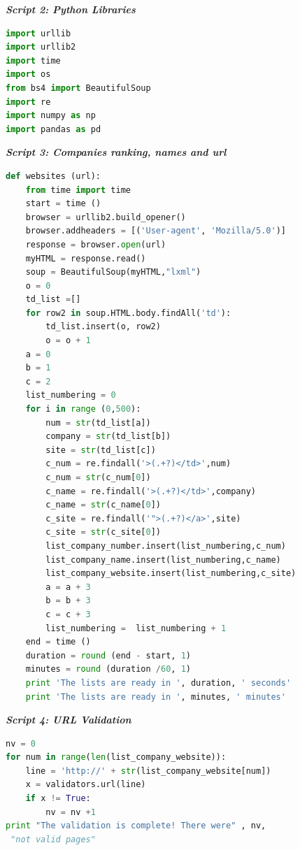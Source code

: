 \documentclass{book}
\begin{document}
\begin{center}
\textit{\textbf{Script 2: Python Libraries}}\label{p2}
\end{center}
\begin{lstlisting}[language=Python]
import urllib
import urllib2
import time
import os
from bs4 import BeautifulSoup
import re
import numpy as np
import pandas as pd\end{lstlisting}

\begin{center}
\textit{\textbf{Script 3: Companies ranking, names and url}}\label{p3}
\end{center}
\begin{lstlisting}[language=Python]
def websites (url): 
    from time import time
    start = time ()
    browser = urllib2.build_opener() 
    browser.addheaders = [('User-agent', 'Mozilla/5.0')]
    response = browser.open(url)
    myHTML = response.read()
    soup = BeautifulSoup(myHTML,"lxml")    
    o = 0
    td_list =[]
    for row2 in soup.HTML.body.findAll('td'):
        td_list.insert(o, row2)
        o = o + 1
    a = 0
    b = 1
    c = 2
    list_numbering = 0
    for i in range (0,500):        
        num = str(td_list[a])
        company = str(td_list[b])
        site = str(td_list[c])
        c_num = re.findall('>(.+?)</td>',num)  
        c_num = str(c_num[0])
        c_name = re.findall('>(.+?)</td>',company)
        c_name = str(c_name[0])
        c_site = re.findall('">(.+?)</a>',site)
        c_site = str(c_site[0])        
        list_company_number.insert(list_numbering,c_num)
        list_company_name.insert(list_numbering,c_name)
        list_company_website.insert(list_numbering,c_site)
        a = a + 3
        b = b + 3
        c = c + 3
        list_numbering =  list_numbering + 1 
    end = time ()
    duration = round (end - start, 1)
    minutes = round (duration /60, 1)
    print 'The lists are ready in ', duration, ' seconds'
    print 'The lists are ready in ', minutes, ' minutes'
\end{lstlisting}

\begin{center}
\textit{\textbf{Script 4: URL Validation}}\label{p4}
\end{center}
\begin{lstlisting}[language=Python]
nv = 0
for num in range(len(list_company_website)):
    line = 'http://' + str(list_company_website[num])
    x = validators.url(line)    
    if x != True:
        nv = nv +1
print "The validation is complete! There were" , nv,
 "not valid pages"
\end{lstlisting}
\end{document}
